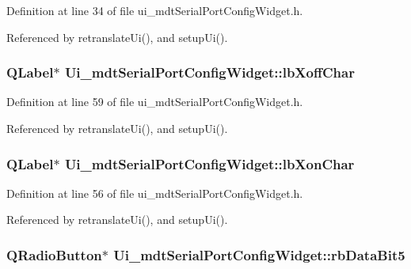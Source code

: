 Definition at line 34 of file ui\-\_\-mdt\-Serial\-Port\-Config\-Widget.\-h.



Referenced by retranslate\-Ui(), and setup\-Ui().

\hypertarget{class_ui__mdt_serial_port_config_widget_a498de5e4f313a717ae2660cac026e61d}{
\subsubsection[{lb\-Xoff\-Char}]{\setlength{\rightskip}{0pt plus 5cm}Q\-Label$\ast$ Ui\-\_\-mdt\-Serial\-Port\-Config\-Widget\-::lb\-Xoff\-Char}}\label{class_ui__mdt_serial_port_config_widget_a498de5e4f313a717ae2660cac026e61d}


Definition at line 59 of file ui\-\_\-mdt\-Serial\-Port\-Config\-Widget.\-h.



Referenced by retranslate\-Ui(), and setup\-Ui().

\hypertarget{class_ui__mdt_serial_port_config_widget_a41531dcdb3c5f7fb04b850b078344c35}{
\subsubsection[{lb\-Xon\-Char}]{\setlength{\rightskip}{0pt plus 5cm}Q\-Label$\ast$ Ui\-\_\-mdt\-Serial\-Port\-Config\-Widget\-::lb\-Xon\-Char}}\label{class_ui__mdt_serial_port_config_widget_a41531dcdb3c5f7fb04b850b078344c35}


Definition at line 56 of file ui\-\_\-mdt\-Serial\-Port\-Config\-Widget.\-h.



Referenced by retranslate\-Ui(), and setup\-Ui().

\hypertarget{class_ui__mdt_serial_port_config_widget_a6ad8c2d98f9e8820705f1ac86cdd126d}{
\subsubsection[{rb\-Data\-Bit5}]{\setlength{\rightskip}{0pt plus 5cm}Q\-Radio\-Button$\ast$ Ui\-\_\-mdt\-Serial\-Port\-Config\-Widget\-::rb\-Data\-Bit5}}\label{class_ui__mdt_serial_port_config_widget_a6ad8c2d98f9e8820705f1ac86cdd126d}


